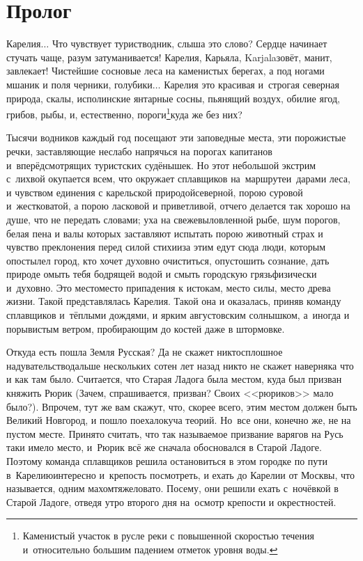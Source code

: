 {

{
\cleardoublepage
{}


\section*{Пролог}

\fancyhead[LE]{\fancyplain{}{}}
\fancyhead[RO]{\fancyplain{}{}}

Карелия$\ldots$ Что чувствует турист\sdash водник, слыша это слово? Сердце начинает стучать чаще, разум затуманивается! Карелия, Карьяла, Karjala\mdash зовёт, манит, завлекает! Чистейшие сосновые леса на каменистых берегах, а под ногами мшаник и поля черники, голубики$\ldots$ Карелия это красивая и~строгая северная природа, скалы, исполинские янтарные сосны, пьянящий воздух, обилие ягод, грибов, рыбы, и, естественно, пороги\footnote{Каменистый участок в русле реки с повышенной скоростью течения и~относительно большим падением отметок уровня воды.}\mdash куда же без них? 

Тысячи водников каждый год посещают эти заповедные места, эти порожистые речки, заставляющие неслабо напрячься на порогах капитанов и~вперёдсмотрящих туристских судёнышек. Но этот небольшой экстрим с~лихвой окупается всем, что окружает сплавщиков на~маршруте\mdash и~дарами леса, и чувством единения с карельской природой\mdash северной, порою суровой и~жестковатой, а порою ласковой и приветливой, отчего делается так хорошо на душе, что не передать словами; уха на свежевыловленной рыбе, шум порогов, белая пена и валы которых заставляют испытать порою животный страх и чувство преклонения перед силой стихии\mdash за этим едут сюда люди, которым опостылел город, кто хочет духовно очиститься, опустошить сознание, дать природе омыть тебя бодрящей водой и смыть городскую грязь\mdash физически и~духовно. Это место\mdash место припадения к истокам, место силы, место древа жизни. Такой представлялась Карелия. Такой она и оказалась, приняв команду сплавщиков и~тёплыми дождями, и ярким августовским солнышком, а~иногда и порывистым ветром, пробирающим до костей даже в штормовке.  

Откуда есть пошла Земля Русская? Да не скажет никто\mdash сплошное надувательство\mdash дальше нескольких сотен лет назад никто не скажет наверняка что и как там было. Считается, что Старая Ладога была местом, куда был призван княжить Рюрик (Зачем, спрашивается, призван? Своих <<рюриков>> мало было?). Впрочем, тут же вам скажут, что, скорее всего, этим местом должен быть Великий Новгород, и пошло поехало\mdash куча теорий. Но~все они, конечно же, не на пустом месте. Принято считать, что так называемое призвание варягов на Русь таки имело место, и~Рюрик всё же сначала обосновался в Старой Ладоге. Поэтому команда сплавщиков решила остановиться в этом городке по пути в~Карелию\mdash интересно и~крепость посмотреть, и ехать до Карелии от Москвы, что называется, одним махом\mdash тяжеловато. Посему, они решили ехать с~ночёвкой в Старой Ладоге, отведя утро второго дня на~осмотр крепости и окрестностей. 

}}
